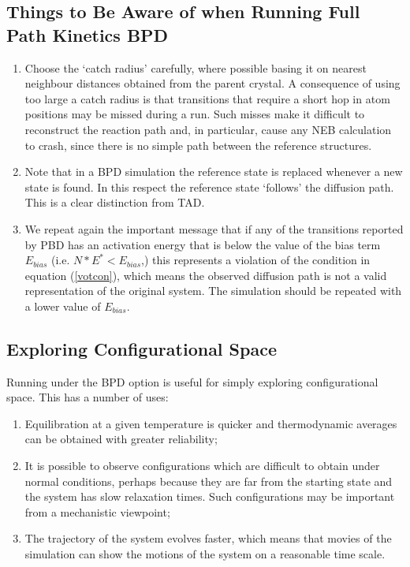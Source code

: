 \subsection{Things to Be Aware of when Running  Full Path Kinetics BPD}

\begin{enumerate}
\item Choose the `catch radius' carefully, where possible basing it on
  nearest neighbour distances obtained from the parent crystal. A
  consequence of using too large a catch radius is that transitions
  that require a short hop in atom positions may be missed during a
  run. Such misses make it difficult to reconstruct the reaction path
  and, in particular, cause any NEB calculation to crash, since there
  is no simple path between the reference structures.
\item Note that in a BPD simulation the reference state is replaced
  whenever a new state is found. In this respect the reference state
  `follows' the diffusion path. This is a clear distinction from TAD.
\item We repeat again the important message that if any of the 
  transitions reported by PBD has an activation energy that is below
  the value of the bias term $E_{bias}$
  (i.e. $N*E^{*}<E_{bias}$,) this represents a violation of the
  condition in equation (\ref{votcon}), which means the observed
  diffusion path is not a valid representation of the original
  system. The simulation should be repeated with a lower value of
  $E_{bias}$.
\end{enumerate}

\subsection{Exploring Configurational Space}
\label{cfgdyn}
Running \D{} under the BPD option is useful for simply exploring
configurational space. This has a number of uses:
\begin{enumerate}
\item Equilibration at a given temperature is quicker and
 thermodynamic averages can be obtained with greater reliability;
\item It is possible to observe configurations which are
 difficult to obtain under normal conditions, perhaps because they are
 far from the starting state and the system has slow relaxation
 times. Such configurations may be important from a mechanistic
 viewpoint;
\item The trajectory of the system evolves faster, which means that
 movies of the simulation can show the motions of the system on a
 reasonable time scale.
\end{enumerate}

